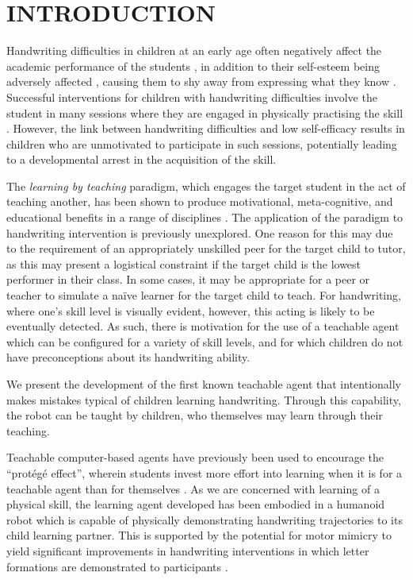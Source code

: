 \documentclass{sig-alternate}
\begin{document}
\section{INTRODUCTION}

Handwriting difficulties in children at an early age often negatively affect
the academic performance of the students \cite{Christensen2005}, in addition to
their self-esteem being adversely affected \cite{Malloy1995}, causing them to
shy away from expressing what they know \cite{Medwell2008}.
Successful interventions for children with handwriting difficulties involve the
student in many sessions where they are engaged in physically practising the
skill \cite{Hoy2011}. However, the link between handwriting difficulties and low
self-efficacy \cite{Engel-Yeger2009} results in children who are unmotivated to
participate in such sessions, potentially leading to a developmental arrest in
the acquisition of the skill. 

The \emph{learning by teaching} paradigm, which engages the target student in
the act of teaching another, has been shown to produce motivational,
meta-cognitive, and educational benefits in a range of disciplines
\cite{Rohrbeck2003}. The application of the paradigm to handwriting intervention
is previously unexplored. One reason for this may due to the requirement of 
an appropriately unskilled peer for the target child to tutor, as this may present
a logistical constraint if the target child is the lowest performer in their class. 
In some cases, it may be appropriate for a
peer or teacher to simulate a na\"ive learner for the target child to teach.
For handwriting, where one's skill level is visually evident, however, 
this acting is likely to be eventually detected. As such,
there is motivation for the use of a teachable agent which can be configured for
a variety of skill levels, and for which children do not have preconceptions
about its handwriting ability.

We present the development of the first known teachable agent
that intentionally makes mistakes typical of children learning
handwriting. Through this capability, the robot can be taught by
children, who themselves may learn through their teaching.

Teachable computer-based agents have previously been used to encourage the 
``protégé effect'', wherein students invest more effort into learning when it
is for a teachable agent than for themselves \cite{Chase2009}. As we are 
concerned with learning of a physical skill, the learning agent developed has 
been embodied in a humanoid robot which is capable of physically demonstrating 
handwriting trajectories to its child learning partner.
This is supported by the potential for motor mimicry to yield significant 
improvements in handwriting interventions in which letter formations are 
demonstrated to participants \cite{Berninger1997}.
\end{document}

